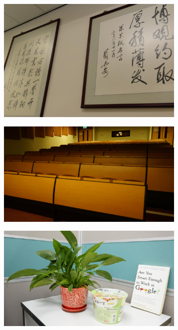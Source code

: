\begin{figure}
\begin{subfigure}[t]{0.32\textwidth}
    \end{subfigure}
    \hfill
    \begin{subfigure}[t]{0.32\textwidth}
        \centering
        \includegraphics[width=1\textwidth]{images/dataset/NikonD800_8_125_6400_photo_mean.JPG}
    \end{subfigure}
    \hfill
    \begin{subfigure}[t]{0.32\textwidth}
        \centering
        \includegraphics[width=1\textwidth]{images/dataset/Sony_3-5_200_1600_classroom_mean.JPG}
    \end{subfigure}
    \hfill
    \begin{subfigure}[t]{0.32\textwidth}
        \centering
        \includegraphics[width=1\textwidth]{images/dataset/Sony_4-5_125_3200_plant_mean.JPG}

\end{subfigure}
\end{figure}
